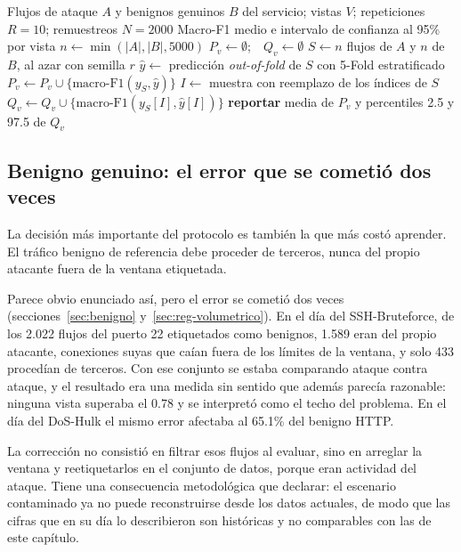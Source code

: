 \begin{algorithm}[htbp]
\caption{Protocolo de comparación entre vistas}
\label{alg:protocolo}
\begin{algorithmic}[1]
\Require Flujos de ataque $A$ y benignos genuinos $B$ del servicio; vistas $V$;
         repeticiones $R = 10$; remuestreos $N = 2000$
\Ensure Macro-F1 medio e intervalo de confianza al 95\% por vista
\State $n \gets \min(|A|, |B|, 5000)$
  \State $P_v \gets \emptyset$;\ \ $Q_v \gets \emptyset$
    \State $S \gets n$ flujos de $A$ y $n$ de $B$, al azar con semilla $r$
    \State $\hat{y} \gets$ predicción \emph{out-of-fold} de $S$ con 5-Fold estratificado
    \State $P_v \gets P_v \cup \{\text{macro-F1}(y_S, \hat{y})\}$
      \State $I \gets$ muestra con reemplazo de los índices de $S$
      \State $Q_v \gets Q_v \cup \{\text{macro-F1}(y_S[I], \hat{y}[I])\}$
    \EndFor
  \EndFor
  \State \textbf{reportar} media de $P_v$ y percentiles 2.5 y 97.5 de $Q_v$
\EndFor
\end{algorithmic}
\end{algorithm}

\subsection*{Benigno genuino: el error que se cometió dos veces}
\label{sec:benigno-genuino}

La decisión más importante del protocolo es también la que más costó aprender.
El tráfico benigno de referencia debe proceder de terceros, nunca del propio
atacante fuera de la ventana etiquetada.

Parece obvio enunciado así, pero el error se cometió dos veces
(secciones~\ref{sec:benigno} y~\ref{sec:reg-volumetrico}). En el día del
SSH-Bruteforce, de los 2.022 flujos del puerto 22 etiquetados como benignos,
1.589 eran del propio atacante, conexiones suyas que caían fuera de los límites
de la ventana, y solo 433 procedían de terceros. Con ese conjunto se estaba
comparando ataque contra ataque, y el resultado era una medida sin sentido que
además parecía razonable: ninguna vista superaba el $0.78$ y se interpretó
como el techo del problema. En el día del DoS-Hulk el mismo error afectaba al
65.1\% del benigno HTTP.

La corrección no consistió en filtrar esos flujos al evaluar, sino en arreglar
la ventana y reetiquetarlos en el conjunto de datos, porque eran actividad del
ataque. Tiene una consecuencia metodológica que declarar: el escenario
contaminado ya no puede reconstruirse desde los datos actuales, de modo que las
cifras que en su día lo describieron son históricas y no comparables con las de
este capítulo.

